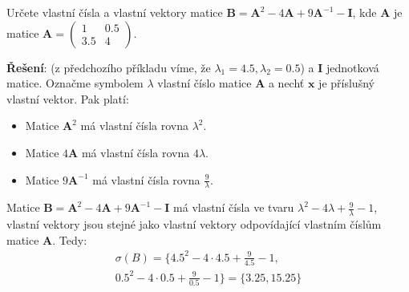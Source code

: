 \begin{mdframed}[style=mdexam]
  \begin{example}\label{mai:exam014}
    Určete vlastní čísla a vlastní vektory matice \(\mathbf{B} = \mathbf{A}^2 - 4\mathbf{A} + 
    9\mathbf{A}^{-1} - \mathbf{I}\), kde \(\mathbf{A}\) je matice \(\mathbf{A}= 
    \begin{pmatrix}1&0.5\\3.5&4\end{pmatrix}\).

    \textbf{Řešení}: (z předchozího příkladu víme, že \(\lambda_1=4.5, \lambda_2=0.5\)) a
    \(\mathbf{I}\) jednotková matice. Označme symbolem \(\lambda\) vlastní číslo matice 
    \(\mathbf{A}\) a nechť \(\mathbf{x}\) je příslušný vlastní vektor. Pak platí:
    \begin{itemize}
      \item Matice \(\mathbf{A}^2\) má vlastní čísla rovna \(\lambda^2\).
      \item Matice \(4\mathbf{A}\) má vlastní čísla rovna \(4\lambda\).
      \item Matice \(9\mathbf{A}^{-1}\) má vlastní čísla rovna \(\frac{9}{\lambda}\).
    \end{itemize}
    Matice \(\mathbf{B}=\mathbf{A}^2-4\mathbf{A}+9\mathbf{A}^{-1}-\mathbf{I}\) má vlastní čísla 
    ve tvaru  \(\lambda^2-4\lambda+\frac{9}{\lambda}-1\), vlastní vektory jsou stejné jako 
    vlastní vektory odpovídající vlastním číslům matice \(\mathbf{A}\). Tedy:
    \begin{multline*}
        \sigma(B)=\{4.5^2-4\cdot4.5+\frac{9}{4.5}-1,\\
        0.5^2-4\cdot0.5+\frac{9}{0.5}-1\}=\{3.25, 15.25\}
    \end{multline*}
  \end{example}
\end{mdframed}